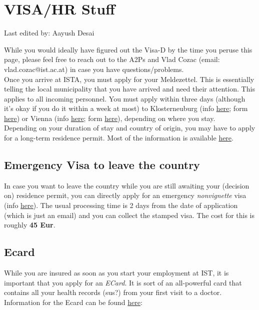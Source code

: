 \documentclass{article}
\newcommand{\setlasteditor}[1]{\gdef\lasteditor{#1}}
\newcommand{\lastedited}{%
    \vspace{1mm} {\footnotesize Last edited by: \lasteditor} \vspace{3mm}
    \newline

}
\begin{document}
\section{VISA/HR Stuff}
\setlasteditor{Aayush Desai}
\lastedited
\noindent
While you would ideally have figured out the Visa-D by the time you peruse this page, please feel free to reach out to the A2Ps and Vlad Cozac (email: vlad.cozac@ist.ac.at) in case you have questions/problems.
\\
Once you arrive at ISTA, you must apply for your Meldezettel. This is essentially telling the local municipality that you have arrived and need their attention. This applies to all incoming personnel. You must apply within three days (although it's okay if you do it within a week at most) to Klosterneuburg (info \href{https://intranet.ista.ac.at/file/file/download?guid=f65ffda4-ab40-4a3c-965b-10dba02f1951\&hash\_sha1=fbf9b0f3}{here}; form \href{https://intranet.ista.ac.at/file/file/download?guid=00ca3b52-29f6-4813-962b-cc852358e9ca\&hash\_sha1=953ce7de}{here}) or Vienna (info \href{}{here}; form \href{https://intranet.ista.ac.at/file/file/download?guid=00ca3b52-29f6-4813-962b-cc852358e9ca\&hash\_sha1=953ce7de}{here}), depending on where you stay. 
\\
\noindent
Depending on your duration of stay and country of origin, you may have to apply for a long-term residence permit. Most of the information is available \href{https://hr.pages.ist.ac.at/residence-permit-registration-in-austria/}{here}.
\subsection{Emergency Visa to leave the country}
\noindent
In case you want to leave the country while you are still awaiting your (decision on) residence permit, you can directly apply for an emergency \emph{nonvignette} visa (info \href{https://www.wien.gv.at/amtswege/notvignette}{here}). The usual processing time is 2 days from the date of application (which is just an email) and you can collect the stamped visa. The cost for this is roughly \textbf{45 Eur}.

\subsection{Ecard}
\noindent
While you are insured as soon as you start your employment at IST, it is important that you apply for an \emph{ECard}. It is sort of an all-powerful card that contains all your health records (sus?) from your first visit to a doctor. Information for the Ecard can be found \href{https://intranet.ista.ac.at/file/file/download?guid=a4e5b7c0-6074-425d-ad33-fa05696081cb&hash_sha1=0ec03d01}{here}: 
\end{document}
